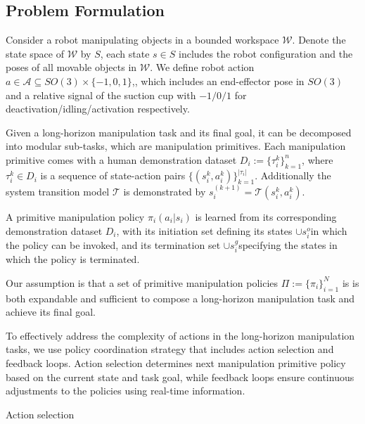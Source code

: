 \subsection{Problem Formulation}

Consider a robot manipulating objects in a bounded workspace $\mathcal W$.
Denote the state space of $\mathcal{W}$ by $S$, each state $s\in S$ includes the robot configuration and the poses of all movable objects in $\mathcal W$.
We define robot action  $ a \in \mathcal A\subseteq SO(3)\times\{-1,0,1\}$,, which includes an end-effector pose in $SO(3)$ and a relative signal of the suction cup with $-1/0/1$ for deactivation/idling/activation respectively. 

Given a long-horizon manipulation task and its final goal, it can be decomposed into modular sub-tasks, which are manipulation primitives. Each manipulation primitive  comes with a human demonstration dataset $D_i:=\{\tau_i^k\}_{k=1}^{n}$,  where  $\tau_i^k \in D_i$ is a sequence of state-action pairs $\{(s_i^k, a_i^k)\}_{k=1}^{|\tau_i|}$. Additionally the system transition  model $\mathcal{T}$ is demonstrated by  \( s_i^{(k+1)} = \mathcal T(s_i^k, a_i^k)\). 

A  primitive manipulation policy \(\pi_i (a_i|s_i)\) is  learned from its corresponding demonstration dataset \(D_i\), with its initiation set defining its states \(\cup s_i^o\)in which the policy can be invoked, and its termination set \( \cup s_i^g\)specifying  the states in which the policy is terminated.

Our assumption is that   a  set of primitive manipulation policies $\Pi :=\{\pi_i\}_{i=1}^{N}$  is is both expandable and sufficient to compose a long-horizon manipulation task and achieve its final goal.

To  effectively address the complexity of actions in the long-horizon manipulation tasks, we  use policy coordination strategy that includes action selection and feedback loops. Action selection determines  next manipulation primitive policy  based on the current state and task goal, while feedback loops ensure continuous adjustments to the policies using  real-time information.

Action selection 